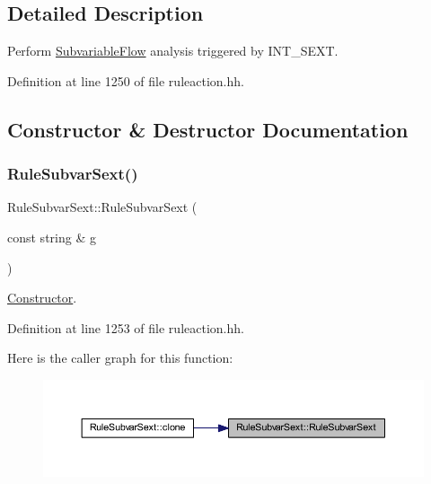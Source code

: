 \subsection{Detailed Description}
Perform \mbox{\hyperlink{class_subvariable_flow}{Subvariable\+Flow}} analysis triggered by I\+N\+T\+\_\+\+S\+E\+XT. 

Definition at line 1250 of file ruleaction.\+hh.



\subsection{Constructor \& Destructor Documentation}
\mbox{\label{class_rule_subvar_sext_a901685eda8e43fb6227b436464c8d62c}} 
\subsubsection{\texorpdfstring{RuleSubvarSext()}{RuleSubvarSext()}}
{\footnotesize\ttfamily Rule\+Subvar\+Sext\+::\+Rule\+Subvar\+Sext (\begin{DoxyParamCaption}\item[{const string \&}]{g }\end{DoxyParamCaption})\hspace{0.3cm}{\ttfamily [inline]}}



\mbox{\hyperlink{class_constructor}{Constructor}}. 



Definition at line 1253 of file ruleaction.\+hh.

Here is the caller graph for this function\+:
\nopagebreak
\begin{figure}[H]
\begin{center}
\leavevmode
\includegraphics[width=350pt]{class_rule_subvar_sext_a901685eda8e43fb6227b436464c8d62c_icgraph}
\end{center}
\end{figure}


